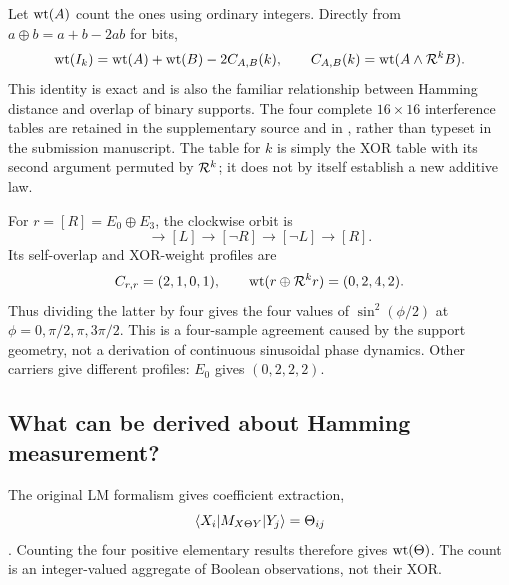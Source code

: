 Let $\operatorname{wt}(A)$ count the ones using ordinary integers. Directly from $a\oplus b=a+b-2ab$ for bits,
\begin{equation}\label{eq:xorweight}
 \operatorname{wt}(I_k)=\operatorname{wt}(A)+\operatorname{wt}(B)-2C_{A,B}(k),\qquad
 C_{A,B}(k)=\operatorname{wt}(A\land\mathcal R^kB).
\end{equation}
This identity is exact and is also the familiar relationship between Hamming distance and overlap of binary supports. The four complete $16\times16$ interference tables are retained in the supplementary source and in , rather than typeset in the submission manuscript. The table for $k$ is simply the XOR table with its second argument permuted by $\mathcal R^k$; it does not by itself establish a new additive law.

For $r=[R]=E_0\oplus E_3$, the clockwise orbit is
\begin{equation}
 [R]\longrightarrow[L]\longrightarrow[\neg R]\longrightarrow[\neg L]\longrightarrow[R].
\end{equation}
Its self-overlap and XOR-weight profiles are
\begin{equation}
 C_{r,r}=(2,1,0,1),\qquad \operatorname{wt}(r\oplus\mathcal R^kr)=(0,2,4,2).
\end{equation}
Thus dividing the latter by four gives the four values of $\sin^2(\phi/2)$ at $\phi=0,\pi/2,\pi,3\pi/2$. This is a four-sample agreement caused by the support geometry, not a derivation of continuous sinusoidal phase dynamics. Other carriers give different profiles: $E_0$ gives $(0,2,2,2)$.

\subsection{What can be derived about Hamming measurement?}
The original LM formalism gives coefficient extraction,
\begin{equation}
 \langle X_i\rvert M_{X\Theta Y}\lvert Y_j\rangle=\Theta_{ij}
\end{equation}
\cite[Section 4.1.4]{droncheff}. Counting the four positive elementary results therefore gives $\operatorname{wt}(\Theta)$. The count is an integer-valued aggregate of Boolean observations, not their XOR.

